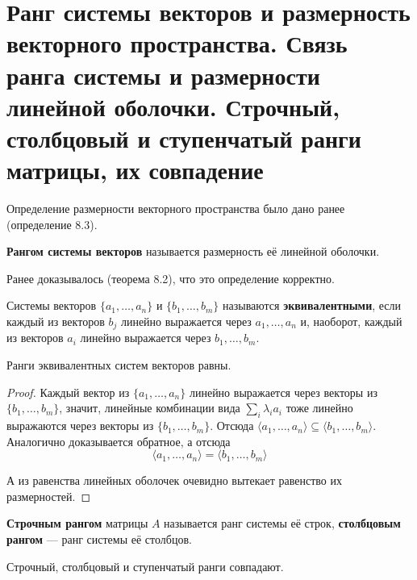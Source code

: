 \section{Ранг системы векторов и размерность векторного пространства. Связь ранга системы и размерности линейной оболочки. Строчный, столбцовый и ступенчатый ранги матрицы, их совпадение}

Определение размерности векторного пространства было дано ранее (определение 8.3).

\begin{definition}
    \textbf{Рангом системы векторов} называется размерность её линейной оболочки.
\end{definition}

Ранее доказывалось (теорема 8.2), что это определение корректно.

\begin{definition}
    Системы векторов $\{a_1, \ldots, a_n\}$ и $\{b_1, \ldots, b_m\}$ называются \textbf{эквивалентными}, если каждый из векторов $b_j$ линейно выражается через $a_1, \ldots, a_n$ и, наоборот, каждый из векторов $a_i$ линейно выражается через $b_1, \ldots, b_m$.
\end{definition}

\begin{lemma}
    Ранги эквивалентных систем векторов равны.
\end{lemma}

\begin{proof}
    Каждый вектор из $\{a_1, \ldots, a_n\}$ линейно выражается через векторы из $\{b_1, \ldots, b_m\}$, значит, линейные комбинации вида $\sum_i\lambda_ia_i$ тоже линейно выражаются через векторы из $\{b_1, \ldots, b_m\}$. Отсюда $\langle a_1, \ldots, a_n\rangle \subseteq \langle b_1, \ldots, b_m\rangle$. Аналогично доказывается обратное, а отсюда
    $$
    \langle a_1, \ldots, a_n\rangle = \langle b_1, \ldots, b_m\rangle
    $$

    А из равенства линейных оболочек очевидно вытекает равенство их размерностей.
\end{proof}

\begin{definition}
    \textbf{Строчным рангом} матрицы $A$ называется ранг системы её строк, \textbf{столбцовым рангом} --- ранг системы её столбцов.
\end{definition}

\begin{theorem}
    Строчный, столбцовый и ступенчатый ранги совпадают.
\end{theorem}

